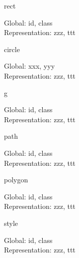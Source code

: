 \documentclass{article}
\begin{document}
\noindent
\begin{Element}{rect}
    \begin{Required}
    \end{Required}
    \begin{Optional}
        Global: id, class\\
        Representation: zzz, ttt
    \end{Optional}
\end{Element}

\begin{Element}{circle}
    \begin{Required}
    \end{Required}
    \begin{Optional}
        Global: xxx, yyy\\
        Representation: zzz, ttt
    \end{Optional}
\end{Element}

\begin{Element}{g}
    \begin{Required}
    \end{Required}
    \begin{Optional}
        Global: id, class\\
        Representation: zzz, ttt
    \end{Optional}
\end{Element}

\begin{Element}{path}
    \begin{Required}
    \end{Required}
    \begin{Optional}
        Global: id, class\\
        Representation: zzz, ttt
    \end{Optional}
\end{Element}

\begin{Element}{polygon}
    \begin{Required}
    \end{Required}
    \begin{Optional}
        Global: id, class\\
        Representation: zzz, ttt
    \end{Optional}
\end{Element}

\begin{Element}{style}
    \begin{Required}
    \end{Required}
    \begin{Optional}
        Global: id, class\\
        Representation: zzz, ttt
    \end{Optional}
\end{Element}
\end{document}
